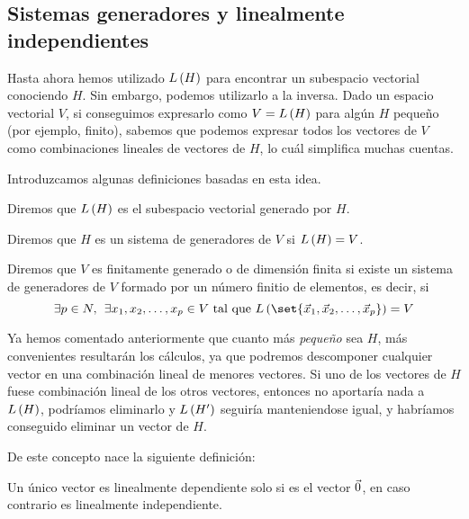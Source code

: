 \documentclass[../ecuaciones_diferenciales.tex]{subfiles}
\begin{document}
\subsection{Sistemas generadores y linealmente independientes}

Hasta ahora hemos utilizado $L\left(H\right)$ para encontrar un subespacio vectorial conociendo $H$. Sin embargo, podemos utilizarlo a la inversa. Dado un espacio vectorial $V$, si conseguimos expresarlo como $V=L\left(H\right)$ para algún $H$ pequeño (por ejemplo, finito), sabemos que podemos expresar todos los vectores de $V$ como combinaciones lineales de vectores de $H$, lo cuál simplifica muchas cuentas.

Introduzcamos algunas definiciones basadas en esta idea.

\begin{definition}
    Diremos que $L\left(H\right)$ es el subespacio vectorial generado por $H$.
\end{definition}

\begin{definition}
    Diremos que $H$ es un sistema de generadores de $V$ si $L\left(H\right) = V$.
\end{definition}

\begin{definition}
    Diremos que $V$ es finitamente generado o de dimensión finita si existe un sistema de generadores de $V$ formado por un número finitio de elementos, es decir, si
    \[
        \exists p \in N, \spc \exists \dlst{x}{p} \in V \st \lspan{\set{\vlst{x}{p}}} = V
    \]  
\end{definition}

Ya hemos comentado anteriormente que cuanto más \textit{pequeño} sea $H$, más convenientes resultarán los cálculos, ya que podremos descomponer cualquier vector en una combinación lineal de menores vectores. Si uno de los vectores de $H$ fuese combinación lineal de los otros vectores, entonces no aportaría nada a $L\left(H\right)$, podríamos eliminarlo y $L\left(H'\right)$ seguiría manteniendose igual, y habríamos conseguido eliminar un vector de $H$. 

De este concepto nace la siguiente definición:

\begin{definition}
    
\end{definition}

\begin{remark}
    Un único vector es linealmente dependiente solo si es el vector $\vec{0}$, en caso contrario es linealmente independiente. 
\end{remark}
\end{document}
